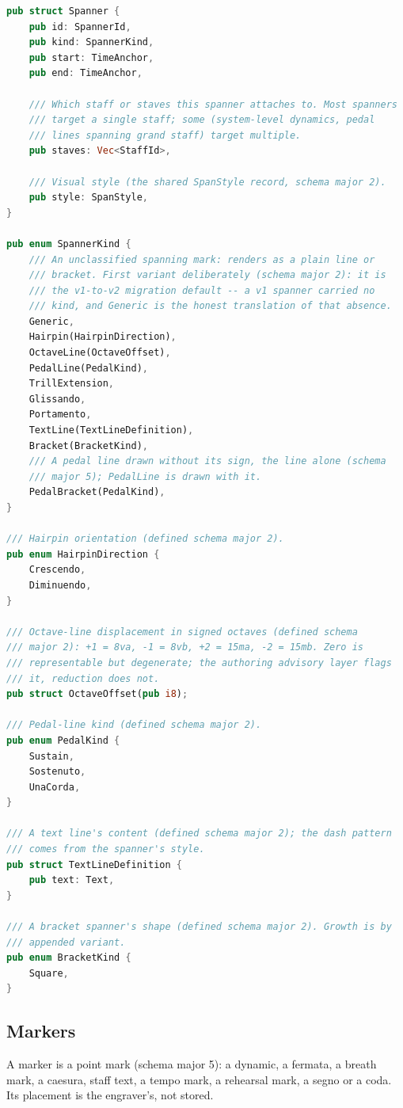 \documentclass[11pt,letterpaper]{report}
\begin{document}
\begin{lstlisting}[language=Rust]
pub struct Spanner {
    pub id: SpannerId,
    pub kind: SpannerKind,
    pub start: TimeAnchor,
    pub end: TimeAnchor,

    /// Which staff or staves this spanner attaches to. Most spanners
    /// target a single staff; some (system-level dynamics, pedal
    /// lines spanning grand staff) target multiple.
    pub staves: Vec<StaffId>,

    /// Visual style (the shared SpanStyle record, schema major 2).
    pub style: SpanStyle,
}

pub enum SpannerKind {
    /// An unclassified spanning mark: renders as a plain line or
    /// bracket. First variant deliberately (schema major 2): it is
    /// the v1-to-v2 migration default -- a v1 spanner carried no
    /// kind, and Generic is the honest translation of that absence.
    Generic,
    Hairpin(HairpinDirection),
    OctaveLine(OctaveOffset),
    PedalLine(PedalKind),
    TrillExtension,
    Glissando,
    Portamento,
    TextLine(TextLineDefinition),
    Bracket(BracketKind),
    /// A pedal line drawn without its sign, the line alone (schema
    /// major 5); PedalLine is drawn with it.
    PedalBracket(PedalKind),
}

/// Hairpin orientation (defined schema major 2).
pub enum HairpinDirection {
    Crescendo,
    Diminuendo,
}

/// Octave-line displacement in signed octaves (defined schema
/// major 2): +1 = 8va, -1 = 8vb, +2 = 15ma, -2 = 15mb. Zero is
/// representable but degenerate; the authoring advisory layer flags
/// it, reduction does not.
pub struct OctaveOffset(pub i8);

/// Pedal-line kind (defined schema major 2).
pub enum PedalKind {
    Sustain,
    Sostenuto,
    UnaCorda,
}

/// A text line's content (defined schema major 2); the dash pattern
/// comes from the spanner's style.
pub struct TextLineDefinition {
    pub text: Text,
}

/// A bracket spanner's shape (defined schema major 2). Growth is by
/// appended variant.
pub enum BracketKind {
    Square,
}
\end{lstlisting}

\subsection{Markers}

A marker is a point mark (schema major 5): a dynamic, a fermata, a
breath mark, a caesura, staff text, a tempo mark, a rehearsal mark, a
segno or a coda. Its placement is the engraver's, not stored.
\end{document}
